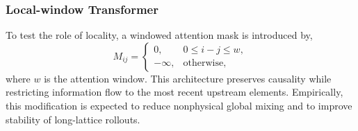 \subsubsection{Local-window Transformer}
To test the role of locality, a windowed attention mask is introduced by,
\begin{equation}
    M_{ij}=\begin{cases}
    0, & 0\le i-j\le w,\\
    -\infty, & \text{otherwise},
    \end{cases}
    \label{eq:window_mask_revised}
\end{equation}
where $w$ is the attention window. This architecture preserves causality while restricting information flow to the most recent upstream elements. Empirically, this modification is expected to reduce nonphysical global mixing and to improve stability of long-lattice rollouts.
